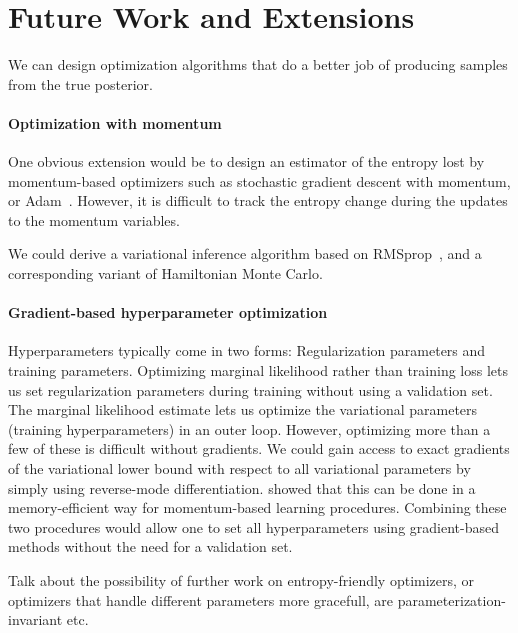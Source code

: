 \documentclass[]{article}
\begin{document}
\section{Future Work and Extensions}

We can design optimization algorithms that do a better job of producing samples from the true posterior.

\paragraph{Optimization with momentum}
One obvious extension would be to design an estimator of the entropy lost by momentum-based optimizers such as stochastic gradient descent with momentum, or Adam~\citep{Adam14}.
However, it is difficult to track the entropy change during the updates to the momentum variables.

We could derive a variational inference algorithm based on RMSprop~\cite{Tieleman2012}, and a corresponding variant of Hamiltonian Monte Carlo.

\paragraph{Gradient-based hyperparameter optimization}
Hyperparameters typically come in two forms:
Regularization parameters and training parameters.
Optimizing marginal likelihood rather than training loss lets us set regularization parameters during training without using a validation set.
The marginal likelihood estimate lets us optimize the variational parameters (training hyperparameters) in an outer loop.
However, optimizing more than a few of these is difficult without gradients.
We could gain access to exact gradients of the variational lower bound with respect to all variational parameters by simply using reverse-mode differentiation.
\citet{MacDuvAda2015hyper} showed that this can be done in a memory-efficient way for momentum-based learning procedures.
Combining these two procedures would allow one to set all hyperparameters using gradient-based methods without the need for a validation set.

Talk about the possibility of further work on entropy-friendly optimizers,
or optimizers that handle different parameters more gracefull, are parameterization-invariant etc.







\end{document}
